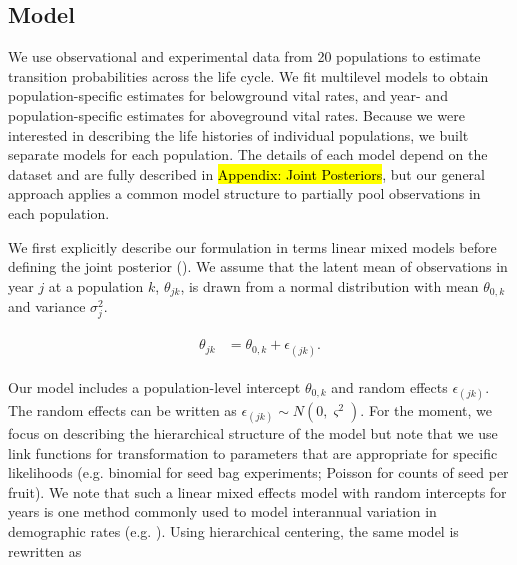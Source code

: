 \documentclass[12pt, oneside, titlepage]{article}   	%
\begin{document}
{%
\begin{singlespace*}
 \label{tab:datasets} 
\begin{center}

\end{center}
\end{singlespace*} 

\subsection{Model}

We use observational and experimental data from 20 populations to estimate transition probabilities across the life cycle. We fit multilevel models to obtain population-specific estimates for belowground vital rates, and year- and population-specific estimates for aboveground vital rates. Because we were interested in describing the life histories of individual populations, we built separate models for each population. The details of each model depend on the dataset and are fully described in \hl{Appendix: Joint Posteriors}, but our general approach applies a common model structure to partially pool observations in each population. 

We first explicitly describe our formulation in terms linear mixed models before defining the joint posterior (\cite{evans2010,ogle2020}). We assume that the latent mean of observations in year $j$ at a population $k$, $\theta_{jk}$, is drawn from a normal distribution with mean $\theta_{0,k}$ and variance $\sigma^2_j$.

\begin{align}
  \begin{split}
  \theta_{jk} &  = \theta_{0,k} +\epsilon_{(jk)}.
  \end{split}
\end{align}

Our model includes a population-level intercept $\theta_{0,k}$ and random effects $\epsilon_{(jk)}$. The random effects can be written as  $\epsilon_{(jk)}\sim N(0, \varsigma^2)$. For the moment, we focus on describing the hierarchical structure of the model but note that we use link functions for transformation to parameters that are appropriate for specific likelihoods (e.g. binomial for seed bag experiments; Poisson for counts of seed per fruit). We note that such a linear mixed effects model with random intercepts for years is one method commonly used to model interannual variation in demographic rates (e.g. \cite{metcalf2015}). Using hierarchical centering, the same model is rewritten as 

}
\end{document}
